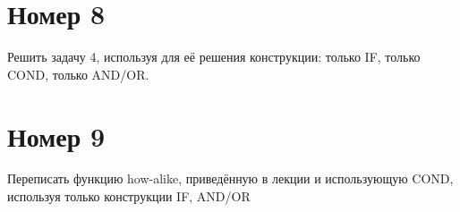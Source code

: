 \section{Номер 8}

Решить задачу 4, используя для её решения конструкции:
только IF, только COND, только AND/OR.

\begin{figure}[H]
    \begin{listingbox}{}
        
    \end{listingbox}
    \label{lst:8}
\end{figure}

\section{Номер 9}

Переписать функцию how-alike, приведённую в лекции и использующую
COND, используя только конструкции IF, AND/OR

\begin{figure}[H]
    \begin{listingbox}{}
        
    \end{listingbox}
    \label{lst:9}
\end{figure}

\clearpage

\begin{figure}[H]
    \begin{listingbox}{}
        
    \end{listingbox}
    \label{lst:defence}
\end{figure}